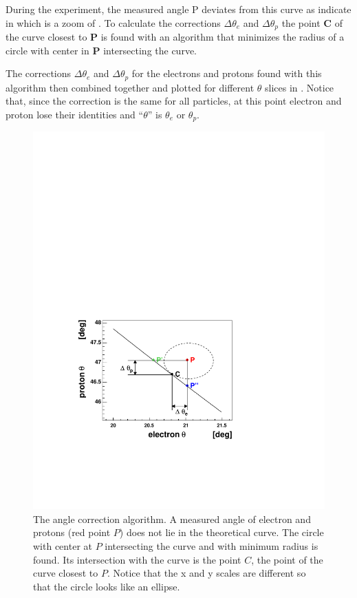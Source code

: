 During the experiment, the measured angle P deviates from this curve as indicate in 
 which is a zoom of . 
To calculate the corrections $\Delta\theta_e$ and  $\Delta\theta_p$ the point {\bf C} of the curve closest to
{\bf P} is found with an algorithm that minimizes the radius of a circle with center in {\bf P} intersecting the curve.

The corrections $\Delta\theta_e$ and  $\Delta\theta_p$ for the electrons and protons 
found with this algorithm then combined together and plotted for 
different $\theta$ slices in . Notice that, since the correction is the same for all particles,
at this point electron and proton lose their identities and
``$\theta$'' is $\theta_e$ or $\theta_p$. 

\clearpage
\begin{figure}[h]
 \begin{center}
 \includegraphics[width = 14cm, bb=60 120 440 520]{data_reduction/kine_corr/img/closer}
  \caption[The angle correction algorithm]
          { The angle correction algorithm. A measured angle of electron and protons (red point $P$) does not lie
                     in the theoretical curve. The circle with center
		     at $P$ intersecting the curve and with minimum radius is found. Its intersection with the curve
		     is the point $C$, the point of the curve closest to $P$. Notice that the x and y scales are different
		     so that the circle looks like an ellipse.}
 \label{fig:closer}
 \end{center}
\end{figure}

